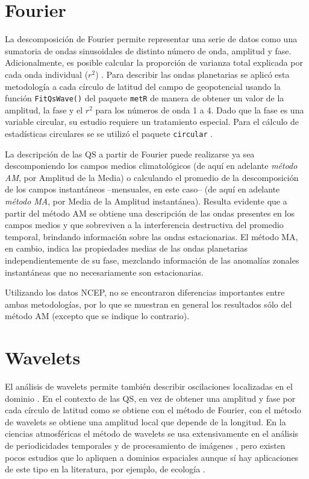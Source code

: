 \documentclass[spanish,a4paper,12pt,oneside]{book}
\begin{document}
\section*{Fourier}

La descomposición de Fourier permite representar una serie de datos como
una sumatoria de ondas sinusoidales de distinto número de onda, amplitud
y fase. Adicionalmente, es posible calcular la proporción de varianza
total explicada por cada onda individual (\(r^2\)) \citep{Wilks2011}.
Para describir las ondas planetarias se aplicó esta metodología a cada
círculo de latitud del campo de geopotencial usando la función
\texttt{FitQsWave()} del paquete \texttt{metR} \citep{R-metR} de manera
de obtener un valor de la amplitud, la fase y el \(r^2\) para los
números de onda 1 a 4. Dado que la fase es una variable circular, su
estudio requiere un tratamiento especial. Para el cálculo de
estadísticas circulares se se utilizó el paquete \texttt{circular}
\citep{R-circular}.

La descripción de las QS a partir de Fourier puede realizarse ya sea
descomponiendo los campos medios climatológicos (de aquí en adelante
\emph{método AM}, por Amplitud de la Media) o calculando el promedio de
la descomposición de los campos instantáneos --mensuales, en este caso--
(de aquí en adelante \emph{método MA}, por Media de la Amplitud
instantánea). Resulta evidente que a partir del método AM se obtiene una
descripción de las ondas presentes en los campos medios y que sobreviven
a la interferencia destructiva del promedio temporal, brindando
información sobre las ondas estacionarias. El método MA, en cambio,
indica las propiedades medias de las ondas planetarias
independientemente de su fase, mezclando información de las anomalías
zonales instantáneas que no necesariamente son estacionarias.

Utilizando los datos NCEP, no se encontraron diferencias importantes
entre ambas metodologías, por lo que se muestran en general los
resultados sólo del método AM (excepto que se indique lo contrario).

\section*{Wavelets}

El análisis de wavelets permite también describir oscilaciones
localizadas en el dominio \citep{Torrence1998}. En el contexto de las
QS, en vez de obtener una amplitud y fase por cada círculo de latitud
como se obtiene con el método de Fourier, con el método de wavelets se
obtiene una amplitud local que depende de la longitud. En la ciencias
atmosféricas el método de wavelets se usa extensivamente en el análisis
de periodicidades temporales \citep[ej.][]{Raphael2004, Kinnard2011} y
de procesamiento de imágenes \citep[ej.][]{Desrochers1999}, pero existen
pocos estudios que lo apliquen a dominios espaciales
\citep[ej.][]{Pinault2016} aunque sí hay aplicaciones de este tipo en la
literatura, por ejemplo, de ecología \citep[ej,][]{Mi2005}.
\end{document}
